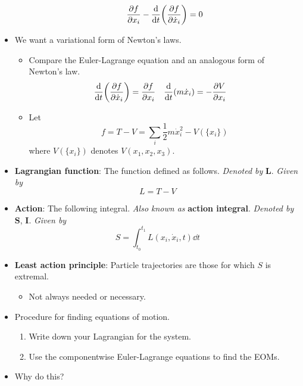 \documentclass[../notes.tex]{subfiles}
\begin{document}
\begin{itemize}
\begin{itemize}
\begin{equation*}
            \pdv{f}{x_i}-\dv{t}(\pdv{f}{\dot{x}_i}) = 0
        \end{equation*}
    \end{itemize}
    \item We want a variational form of Newton's laws.
    \begin{itemize}
        \item Compare the Euler-Lagrange equation and an analogous form of Newton's law.
        \begin{align*}
            \dv{t}(\pdv{f}{\dot{x}_i}) &= \pdv{f}{x_i}&
            \dv{t}(m\dot{x}_i) &= -\pdv{V}{x_i}
        \end{align*}
        \item Let
        \begin{equation*}
            f = T-V
            = \sum_i\frac{1}{2}m\dot{x}_i^2-V(\{x_i\})
        \end{equation*}
        where $V(\{x_i\})$ denotes $V(x_1,x_2,x_3)$.
    \end{itemize}
    \item \textbf{Lagrangian function}: The function defined as follows. \emph{Denoted by} $\bm{L}$. \emph{Given by}
    \begin{equation*}
        L = T-V
    \end{equation*}
    \item \textbf{Action}: The following integral. \emph{Also known as} \textbf{action integral}. \emph{Denoted by} $\bm{S}$, $\bm{I}$. \emph{Given by}
    \begin{equation*}
        S = \int_{t_0}^{t_1}L(x_i,\dot{x}_i,t)\dd{t}
    \end{equation*}
    \item \textbf{Least action principle}: Particle trajectories are those for which $S$ is extremal.
    \begin{itemize}
        \item Not always needed or necessary.
    \end{itemize}
    \item Procedure for finding equations of motion.
    \begin{enumerate}
        \item Write down your Lagrangian for the system.
        \item Use the componentwise Euler-Lagrange equations to find the EOMs.
    \end{enumerate}
    \item Why do this?
    \begin{enumerate}

\end{enumerate}
\end{itemize}
\end{document}
